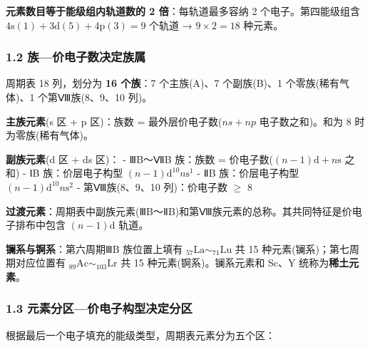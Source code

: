 \textbf{元素数目等于能级组内轨道数的 2 倍}：每轨道最多容纳 2 个电子。第四能级组含 \(4\mathrm{s}(1)+3\mathrm{d}(5)+4\mathrm{p}(3)=9\) 个轨道 → \(9\times2=18\) 种元素。

\subsubsection{1.2 族---价电子数决定族属}\label{ux65cfux4ef7ux7535ux5b50ux6570ux51b3ux5b9aux65cfux5c5e}

周期表 18 列，划分为 \textbf{16 个族}：7 个主族(A)、7 个副族(B)、1 个零族(稀有气体)、1 个第Ⅷ族(8、9、10 列)。

\textbf{主族元素}(s 区 + p 区)：族数 = 最外层价电子数(\(ns + np\) 电子数之和)。和为 8 时为零族(稀有气体)。

\textbf{副族元素}(d 区 + ds 区)：
- ⅢB～ⅦB 族：族数 = 价电子数(\((n-1)\mathrm{d} + n\mathrm{s}\) 之和)
- ⅠB 族：价层电子构型 \((n-1)\mathrm{d}^{10}n\mathrm{s}^{1}\)
- ⅡB 族：价层电子构型 \((n-1)\mathrm{d}^{10}n\mathrm{s}^{2}\)
- 第Ⅷ族(8、9、10 列)：价电子数 \(\geq\) 8

\textbf{过渡元素}：周期表中副族元素(ⅢB～ⅡB)和第Ⅷ族元素的总称。其共同特征是价电子排布中包含 \((n-1)\mathrm{d}\) 轨道。

\textbf{镧系与锕系}：第六周期ⅢB 族位置上填有 \(_{57}\mathrm{La}\sim _{71}\mathrm{Lu}\) 共 15 种元素(镧系)；第七周期对应位置有 \(_{89}\mathrm{Ac}\sim _{103}\mathrm{Lr}\) 共 15 种元素(锕系)。镧系元素和 Sc、Y 统称为\textbf{稀土元素}。

\subsubsection{1.3 元素分区---价电子构型决定分区}\label{ux5143ux7d20ux5206ux533aux4ef7ux7535ux5b50ux6784ux578bux51b3ux5b9aux5206ux533a}

根据最后一个电子填充的能级类型，周期表元素分为五个区：

